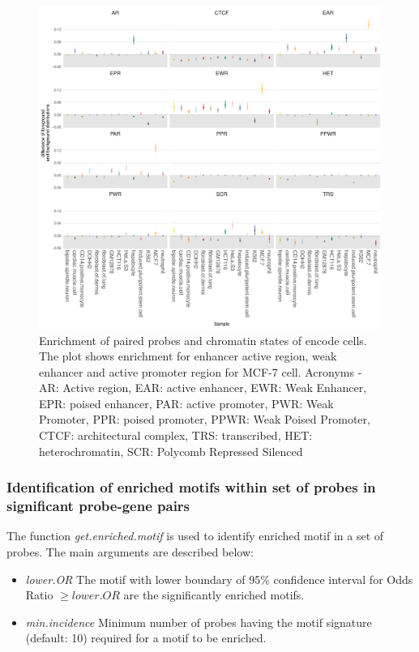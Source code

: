 \begin{figure}
\centering
\includegraphics[width=1.0\textwidth]{images/funcivar.pdf}
\caption[ Enrichment of paired probes and chromatin states of encode cells.]{\label{fig:funcivar} Enrichment of paired probes and chromatin states of encode cells.
The plot shows enrichment for enhancer active region, weak enhancer  and active
promoter region for MCF-7 cell. Acronyms - AR: Active region, EAR: active enhancer,
 EWR: Weak Enhancer, EPR: poised enhancer, PAR: active promoter, PWR: Weak Promoter,
 PPR: poised promoter, PPWR: Weak Poised Promoter, CTCF: architectural complex,
 TRS: transcribed, HET: heterochromatin, SCR: Polycomb Repressed Silenced}
\end{figure}



\subsubsection*{Identification of enriched motifs within set of probes in significant probe-gene pairs}
The function \textit{get.enriched.motif} is used to identify enriched motif in a set of probes.
The main arguments are described below:
\begin{itemize}
\item \textit{lower.OR}	 The motif with lower boundary of 95\% confidence interval for Odds Ratio $\geq lower.OR$  are the significantly enriched motifs.
\item \textit{min.incidence} Minimum number of probes having the motif signature (default: 10) required for a motif to be enriched.
\end{itemize}


